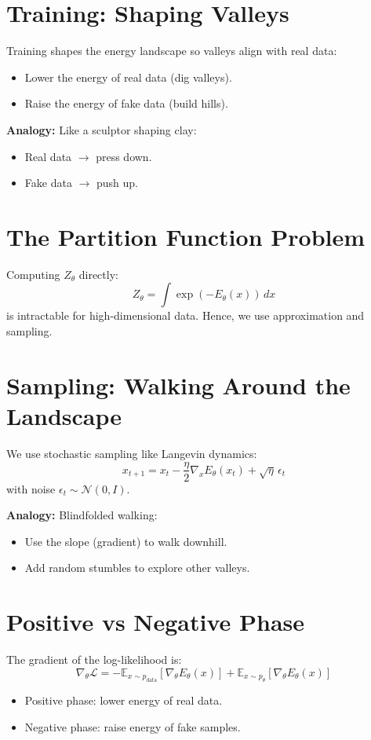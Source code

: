 \documentclass[11pt]{article}
\theoremstyle{remark}
\begin{document}
\section{Training: Shaping Valleys}
Training shapes the energy landscape so valleys align with real data:
\begin{itemize}
  \item Lower the energy of real data (dig valleys).
  \item Raise the energy of fake data (build hills).
\end{itemize}

\textbf{Analogy:} Like a sculptor shaping clay:
\begin{itemize}
  \item Real data $\rightarrow$ press down.
  \item Fake data $\rightarrow$ push up.
\end{itemize}

\section{The Partition Function Problem}
Computing $Z_\theta$ directly:
\[
  Z_\theta = \int \exp(-E_\theta(x))\, dx
\]
is intractable for high-dimensional data. Hence, we use approximation and sampling.

\section{Sampling: Walking Around the Landscape}
We use stochastic sampling like Langevin dynamics:
\[
  x_{t+1} = x_t - \frac{\eta}{2} \nabla_x E_\theta(x_t) + \sqrt{\eta} \, \epsilon_t
\]
with noise $\epsilon_t \sim \mathcal{N}(0, I)$.

\textbf{Analogy:} Blindfolded walking:
\begin{itemize}
  \item Use the slope (gradient) to walk downhill.
  \item Add random stumbles to explore other valleys.
\end{itemize}

\section{Positive vs Negative Phase}
The gradient of the log-likelihood is:
\[
  \nabla_\theta \mathcal{L} = -\mathbb{E}_{x \sim p_{\text{data}}}[\nabla_\theta E_\theta(x)] + \mathbb{E}_{x \sim p_\theta}[\nabla_\theta E_\theta(x)]
\]
\begin{itemize}
  \item Positive phase: lower energy of real data.
  \item Negative phase: raise energy of fake samples.
\end{itemize}
\end{document}
